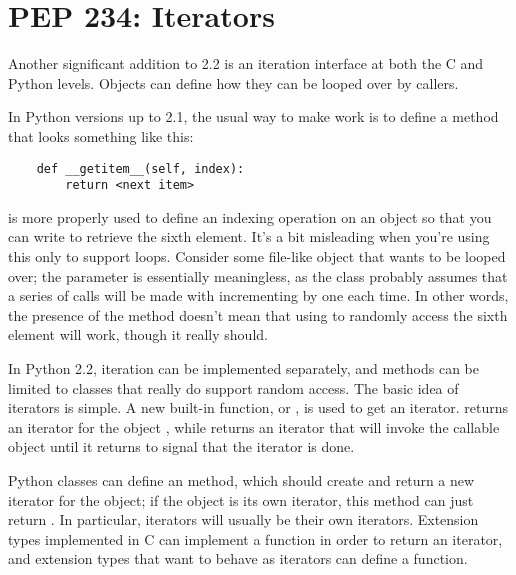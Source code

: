\documentclass{howto}
\begin{document}
\section{PEP 234: Iterators}

Another significant addition to 2.2 is an iteration interface at both
the C and Python levels.  Objects can define how they can be looped
over by callers.

In Python versions up to 2.1, the usual way to make  work is to define a  method that looks
something like this:

\begin{verbatim}
    def __getitem__(self, index):
        return <next item>
\end{verbatim}

 is more properly used to define an indexing
operation on an object so that you can write  to retrieve
the sixth element.  It's a bit misleading when you're using this only
to support  loops.  Consider some file-like object that
wants to be looped over; the  parameter is essentially
meaningless, as the class probably assumes that a series of
 calls will be made with 
incrementing by one each time.  In other words, the presence of the
 method doesn't mean that using  
to randomly access the sixth element will work, though it really should.

In Python 2.2, iteration can be implemented separately, and
 methods can be limited to classes that really
do support random access.  The basic idea of iterators is 
simple.  A new built-in function,  or
, is used to get an iterator.
 returns an iterator for the object ,
while  returns an iterator that
will invoke the callable object  until it returns
 to signal that the iterator is done.  

Python classes can define an  method, which should
create and return a new iterator for the object; if the object is its
own iterator, this method can just return .  In particular,
iterators will usually be their own iterators.  Extension types
implemented in C can implement a  function in order to
return an iterator, and extension types that want to behave as
iterators can define a  function.
\end{document}
